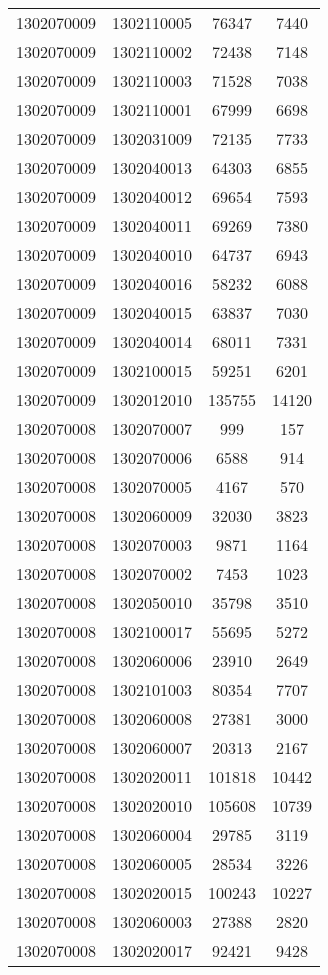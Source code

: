\begin{longtable}{llcc}
1302070009 & 1302110005 & 76347 & 7440\\
1302070009 & 1302110002 & 72438 & 7148\\
1302070009 & 1302110003 & 71528 & 7038\\
1302070009 & 1302110001 & 67999 & 6698\\
1302070009 & 1302031009 & 72135 & 7733\\
1302070009 & 1302040013 & 64303 & 6855\\
1302070009 & 1302040012 & 69654 & 7593\\
1302070009 & 1302040011 & 69269 & 7380\\
1302070009 & 1302040010 & 64737 & 6943\\
1302070009 & 1302040016 & 58232 & 6088\\
1302070009 & 1302040015 & 63837 & 7030\\
1302070009 & 1302040014 & 68011 & 7331\\
1302070009 & 1302100015 & 59251 & 6201\\
1302070009 & 1302012010 & 135755 & 14120\\
1302070008 & 1302070007 & 999 & 157\\
1302070008 & 1302070006 & 6588 & 914\\
1302070008 & 1302070005 & 4167 & 570\\
1302070008 & 1302060009 & 32030 & 3823\\
1302070008 & 1302070003 & 9871 & 1164\\
1302070008 & 1302070002 & 7453 & 1023\\
1302070008 & 1302050010 & 35798 & 3510\\
1302070008 & 1302100017 & 55695 & 5272\\
1302070008 & 1302060006 & 23910 & 2649\\
1302070008 & 1302101003 & 80354 & 7707\\
1302070008 & 1302060008 & 27381 & 3000\\
1302070008 & 1302060007 & 20313 & 2167\\
1302070008 & 1302020011 & 101818 & 10442\\
1302070008 & 1302020010 & 105608 & 10739\\
1302070008 & 1302060004 & 29785 & 3119\\
1302070008 & 1302060005 & 28534 & 3226\\
1302070008 & 1302020015 & 100243 & 10227\\
1302070008 & 1302060003 & 27388 & 2820\\
1302070008 & 1302020017 & 92421 & 9428\\

\end{longtable}
